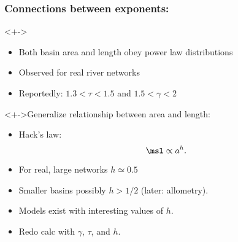 \begin{frame}
  \frametitle{Connections between exponents:}

  \begin{block}<+->{}
  \begin{itemize}
  \item<+-> 
    Both basin area and length obey power law distributions
  \item<+-> 
    Observed for real river networks
  \item<+-> 
    Reportedly: $1.3 < \tau < 1.5$ and $1.5 < \gamma < 2$
  \end{itemize}
  \end{block}

  \begin{block}<+->{Generalize relationship between area and length:}
  \begin{itemize}
  \item<+-> 
    Hack's law\cite{hack1957a}:
    $$\msl \propto a^h.$$
  \item<+-> 
    For real, large networks $h \simeq 0.5$
  \item<+-> 
    Smaller basins possibly $h>1/2$ (later: allometry).
  \item<+-> 
    Models exist with interesting values of $h$.
  \item<+-> 
     Redo calc with $\gamma$, $\tau$, and $h$.
  \end{itemize}
  \end{block}
  
\end{frame}

